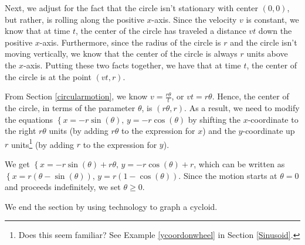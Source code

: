 \smallskip

Next, we  adjust for the fact that the circle isn't stationary with center $(0,0)$, but rather, is rolling along the positive $x$-axis.  Since the velocity $v$ is constant, we know that at time $t$, the center of the circle has traveled a distance $vt$ down the positive $x$-axis.  Furthermore, since the radius of the circle is $r$ and the circle isn't moving vertically, we know that the center of the circle is always $r$ units above the $x$-axis.   Putting these two facts together, we have that at time $t$, the center of the circle is at the point $(vt,r)$. 

\smallskip

From Section \ref{circularmotion}, we know $v = \frac{r \theta}{t}$, or $vt = r\theta$.  Hence, the center of the circle, in terms of the parameter $\theta$, is $(r\theta,r)$. As a result, we need to modify the equations $\left\{ x = -r\sin(\theta), \, y = -r\cos(\theta) \right.$  by shifting the $x$-coordinate to the right $r\theta$ units (by adding $r\theta$ to the expression for $x$) and the $y$-coordinate up $r$ units\footnote{Does this seem familiar?  See Example \ref{ycoordonwheel} in Section \ref{Sinusoid}.} (by adding $r$ to the expression for $y$).  

\smallskip

We get $\left\{ x = -r\sin(\theta)+ r\theta, \, y = -r\cos(\theta) + r \right.$, which can be written as $\left\{ x = r(\theta -\sin(\theta)), \, y = r(1-\cos(\theta)) \right.$. Since the motion starts at $\theta = 0$ and proceeds indefinitely, we set  $\theta \geq 0$.  

\smallskip

We end the section by using technology to graph a cycloid.

